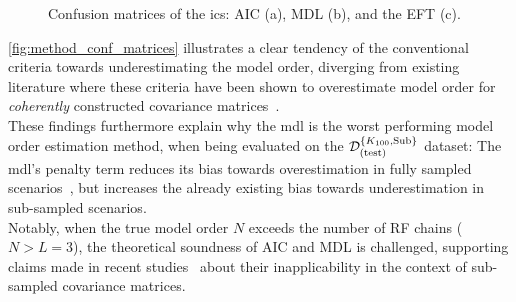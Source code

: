 \begin{figure}[H]
    \centering
    \hfill
    \hfill
    \caption{Confusion matrices of the \glspl{ic}: AIC (a), MDL (b), and the EFT (c).}
    \label{fig:method_conf_matrices}
\end{figure}

\autoref{fig:method_conf_matrices} illustrates a clear tendency of the conventional criteria towards underestimating
the model order, diverging from existing literature where these criteria have been shown to overestimate model order
for \emph{coherently} constructed covariance matrices~\cite{barthelme2020}. \\
These findings furthermore explain why the \gls{mdl} is the worst performing model order estimation method, when being
evaluated on the \( \mathcal{D}^{\{K_{100},\text{Sub}\}}_{(\text{test})} \) dataset: The \gls{mdl}'s penalty term reduces its bias towards overestimation in
fully sampled scenarios~\cite{eft}, but increases the already existing bias towards underestimation in sub-sampled scenarios. \\
Notably, when the true model order \(N\) exceeds the number of RF chains (\(N > L = 3\)), the theoretical soundness of
AIC and MDL is challenged, supporting claims made in recent studies~\cite{barthelme21sub} about their inapplicability
in the context of sub-sampled covariance matrices.

